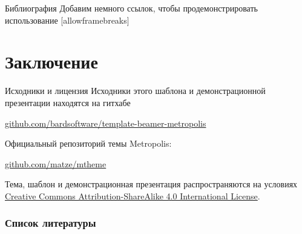 \documentclass[12pt]{beamer}
\begin{document}
\begin{frame}{Библиография}
Добавим немного ссылок, чтобы продемонстрировать использование [allowframebreaks] \cite{knuth92,ConcreteMath,Simpson,Er01,greenwade93}
\end{frame}

\section{Заключение}

\begin{frame}{Исходники и лицензия}
Исходники этого шаблона и демонстрационной презентации находятся на гитхабе

\begin{center}\url{github.com/bardsoftware/template-beamer-metropolis}\end{center}

Официальный репозиторий темы Metropolis:

\begin{center}\url{github.com/matze/mtheme}\end{center}

Тема, шаблон и демонстрационная презентация распространяются на условиях
\href{http://creativecommons.org/licenses/by-sa/4.0/}{Creative Commons
Attribution-ShareAlike 4.0 International License}.

\begin{center}\ccbysa\end{center}

\end{frame}


\begin{frame}[allowframebreaks]
\frametitle{Список литературы}




\end{frame}
\end{document}
